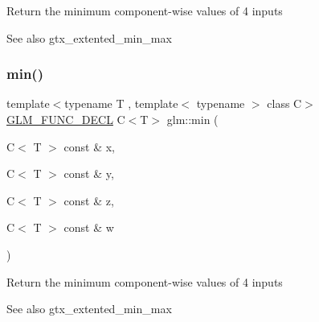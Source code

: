 Return the minimum component-\/wise values of 4 inputs \begin{DoxySeeAlso}{See also}
gtx\+\_\+extented\+\_\+min\+\_\+max 
\end{DoxySeeAlso}
\mbox{\label{group__gtx__extended__min__max_ga7471ea4159eed8dd9ea4ac5d46c2fead}} 
\subsubsection{\texorpdfstring{min()}{min()}\hspace{0.1cm}{\footnotesize\ttfamily [6/6]}}
{\footnotesize\ttfamily template$<$typename T , template$<$ typename $>$ class C$>$ \\
\hyperlink{setup_8hpp_ab2d052de21a70539923e9bcbf6e83a51}{G\+L\+M\+\_\+\+F\+U\+N\+C\+\_\+\+D\+E\+CL} C$<$T$>$ glm\+::min (\begin{DoxyParamCaption}\item[{C$<$ T $>$ const \&}]{x,  }\item[{C$<$ T $>$ const \&}]{y,  }\item[{C$<$ T $>$ const \&}]{z,  }\item[{C$<$ T $>$ const \&}]{w }\end{DoxyParamCaption})}

Return the minimum component-\/wise values of 4 inputs \begin{DoxySeeAlso}{See also}
gtx\+\_\+extented\+\_\+min\+\_\+max 
\end{DoxySeeAlso}
